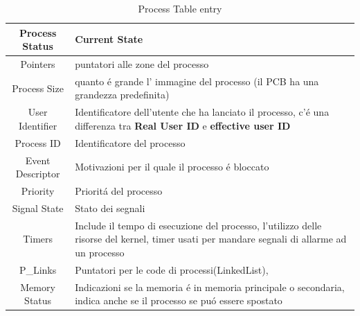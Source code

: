 \begin{table}[H]
    \raggedright
    \begin{tabular}{|c|p{10cm}|}
        \hline
        Process Status & Current State \\
        \hline
        Pointers & puntatori alle zone del processo\\
        \hline
        Process Size & quanto é grande l' immagine del processo (il PCB ha una grandezza predefinita) \\
        \hline
        User Identifier & Identificatore dell'utente che ha lanciato il processo, c'é una differenza tra \textbf{Real User ID} e \textbf{ effective user ID}  \\
        \hline
        Process ID & Identificatore del processo \\
        \hline
        Event Descriptor & Motivazioni per il quale il processo é bloccato \\
        \hline
        Priority & Prioritá del processo \\
        \hline
        Signal State & Stato dei segnali \\
        \hline
        Timers & Include il tempo di esecuzione del processo, l'utilizzo delle risorse del kernel, timer usati per mandare segnali di allarme ad un processo \\
        \hline
        P_Links & Puntatori per le code di processi(LinkedList), \\
        \hline
        Memory Status & Indicazioni se la memoria é in memoria principale o secondaria, indica anche se il processo se puó essere spostato \\
        \hline
    \end{tabular}
    \caption{Process Table entry}
    \label{tab:esempio}
\end{table}